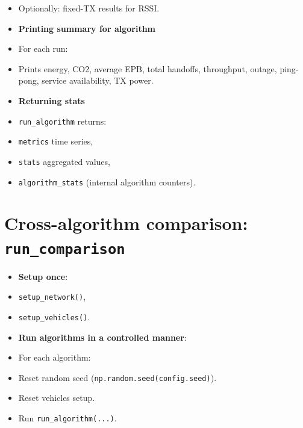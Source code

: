 \documentclass[conference]{IEEEtran}
\begin{document}
\begin{itemize}
\item Optionally: fixed-TX results for RSSI.
\item \textbf{Printing summary for algorithm}
\item For each run:
\item Prints energy, CO2, average EPB, total handoffs, throughput, outage, ping-pong, service availability, TX power.
\item \textbf{Returning stats}
\item \texttt{run\_algorithm} returns:
\item \texttt{metrics} time series,
\item \texttt{stats} aggregated values,
\item \texttt{algorithm\_stats} (internal algorithm counters).
\end{itemize}



\section{Cross-algorithm comparison: \texttt{run_comparison}}
\begin{itemize}
\item \textbf{Setup once}:
\item \texttt{setup\_network()},
\item \texttt{setup\_vehicles()}.
\item \textbf{Run algorithms in a controlled manner}:
\item For each algorithm:
\item Reset random seed (\texttt{np.random.seed(config.seed)}).
\item Reset vehicles setup.
\item Run \texttt{run\_algorithm(...)}.
\end{itemize}
\end{document}
